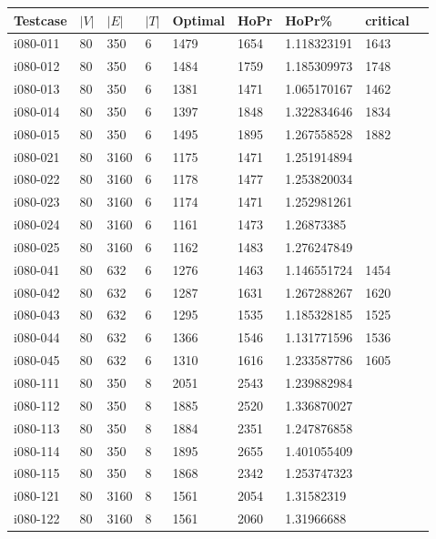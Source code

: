 \begin{appendices}
\begin{longtable}[htbp]{l l l l l l l l l}
Testcase	&	$|V|$	&	$|E|$	&	$|T|$	&	Optimal	&	HoPr	&	HoPr\%	& critical \\ \hline
\endhead
 i080-011	&	80 	&	350 	&	6 	&	1479	&	1654	&	1.118323191	&	1643	\\
 i080-012	&	80 	&	350 	&	6 	&	1484	&	1759	&	1.185309973	&	1748	\\
 i080-013	&	80 	&	350 	&	6 	&	1381	&	1471	&	1.065170167	&	1462	\\
 i080-014	&	80 	&	350 	&	6 	&	1397	&	1848	&	1.322834646	&	1834	\\
 i080-015	&	80 	&	350 	&	6 	&	1495	&	1895	&	1.267558528	&	1882	\\
\hline
 i080-021	&	80 	&	3160 	&	6 	&	1175	&	1471	&	1.251914894	&		\\
 i080-022	&	80 	&	3160 	&	6 	&	1178	&	1477	&	1.253820034	&		\\
 i080-023	&	80 	&	3160 	&	6 	&	1174	&	1471	&	1.252981261	&		\\
 i080-024	&	80 	&	3160 	&	6 	&	1161	&	1473	&	1.26873385	&		\\
 i080-025	&	80 	&	3160 	&	6 	&	1162	&	1483	&	1.276247849	&		\\
\hline
 i080-041	&	80 	&	632 	&	6 	&	1276	&	1463	&	1.146551724	&	1454	\\
 i080-042	&	80 	&	632 	&	6 	&	1287	&	1631	&	1.267288267	&	1620	\\
 i080-043	&	80 	&	632 	&	6 	&	1295	&	1535	&	1.185328185	&	1525	\\
 i080-044	&	80 	&	632 	&	6 	&	1366	&	1546	&	1.131771596	&	1536	\\
 i080-045	&	80 	&	632 	&	6 	&	1310	&	1616	&	1.233587786	&	1605	\\
\hline
 i080-111	&	80 	&	350 	&	8 	&	2051	&	2543	&	1.239882984	&		\\
 i080-112	&	80 	&	350 	&	8 	&	1885	&	2520	&	1.336870027	&		\\
 i080-113	&	80 	&	350 	&	8 	&	1884	&	2351	&	1.247876858	&		\\
 i080-114	&	80 	&	350 	&	8 	&	1895	&	2655	&	1.401055409	&		\\
 i080-115	&	80 	&	350 	&	8 	&	1868	&	2342	&	1.253747323	&		\\
\hline
 i080-121	&	80 	&	3160 	&	8 	&	1561	&	2054	&	1.31582319	&		\\
 i080-122	&	80 	&	3160 	&	8 	&	1561	&	2060	&	1.31966688	&		\\

\end{longtable}
\end{appendices}
